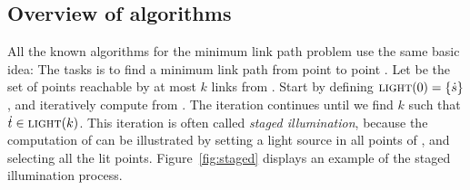 \documentclass[english,gradu]{tktltiki2018}
\begin{document}
\subsection{Overview of algorithms}\label{sec:overview}

All the known algorithms for the minimum link path problem use the same basic idea:
The tasks is to find a minimum link path from point \spt to point \ept.
Let  be the set of points reachable by at most $k$ links from \spt.
Start by defining $\textsc{light}(0)=\left\{\dot{s}\right\}$, and iteratively compute  from .
The iteration continues until we find $k$ such that $\dot{t}\in\textsc{light}(k)$.
This iteration is often called \emph{staged illumination}, because the computation of  can be illustrated by setting a light source in all points of , and selecting all the lit points.
Figure~\ref{fig:staged} displays an example of the staged illumination process.
\end{document}
